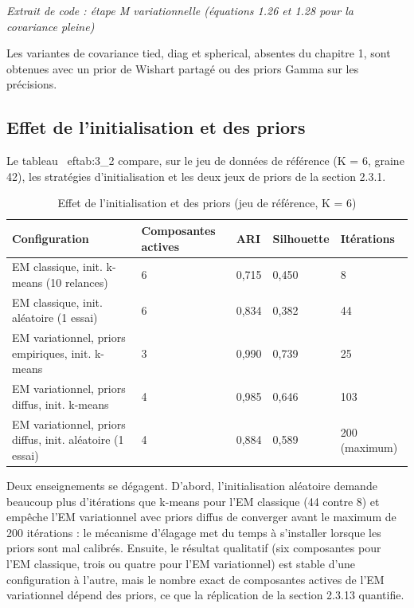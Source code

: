 \begin{center}\small\emph{Extrait de code : étape M variationnelle (équations 1.26 et 1.28 pour la covariance pleine)}\end{center}

Les variantes de covariance tied, diag et spherical, absentes du chapitre 1, sont obtenues avec un prior de Wishart partagé ou des priors Gamma sur les précisions.

\subsection{Effet de l'initialisation et des priors}
Le tableau~
ef{tab:3_2} compare, sur le jeu de données de référence (K = 6, graine 42), les stratégies d'initialisation et les deux jeux de priors de la section 2.3.1.

\begin{table}[H]
\centering
\small
\setlength{\tabcolsep}{0.1cm}
\begin{tabular}{|p{6.4cm}|p{1.8cm}|p{1.2cm}|p{1.8cm}|p{1.8cm}|}
\hline
\textbf{Configuration} & \textbf{Composantes actives} & \textbf{ARI} & \textbf{Silhouette} & \textbf{Itérations} \\
\hline
EM classique, init. k-means (10 relances) & 6 & 0,715 & 0,450 & 8 \\
\hline
EM classique, init. aléatoire (1 essai) & 6 & 0,834 & 0,382 & 44 \\
\hline
EM variationnel, priors empiriques, init. k-means & 3 & 0,990 & 0,739 & 25 \\
\hline
EM variationnel, priors diffus, init. k-means & 4 & 0,985 & 0,646 & 103 \\
\hline
EM variationnel, priors diffus, init. aléatoire (1 essai) & 4 & 0,884 & 0,589 & 200 (maximum) \\
\hline
\end{tabular}
\caption{Effet de l'initialisation et des priors (jeu de référence, K = 6)}
\label{tab:3_2}
\end{table}
Deux enseignements se dégagent. D'abord, l'initialisation aléatoire demande beaucoup plus d'itérations que k-means pour l'EM classique (44 contre 8) et empêche l'EM variationnel avec priors diffus de converger avant le maximum de 200 itérations : le mécanisme d'élagage met du temps à s'installer lorsque les priors sont mal calibrés. Ensuite, le résultat qualitatif (six composantes pour l'EM classique, trois ou quatre pour l'EM variationnel) est stable d'une configuration à l'autre, mais le nombre exact de composantes actives de l'EM variationnel dépend des priors, ce que la réplication de la section 2.3.13 quantifie.

